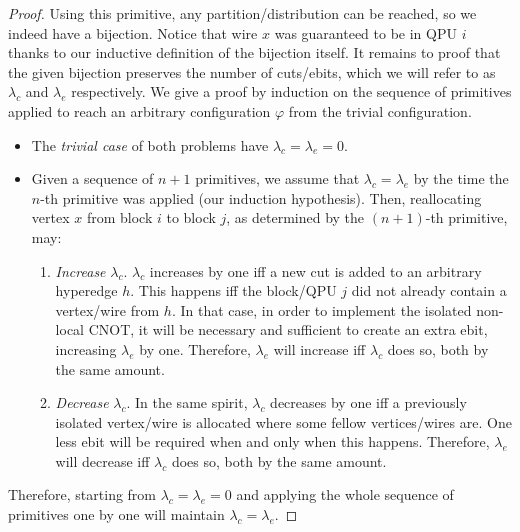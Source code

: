 \begin{proof}
Using this primitive, any partition/distribution can be reached, so we indeed have a bijection. Notice that wire \(x\) was guaranteed to be in QPU \(i\) thanks to our inductive definition of the bijection itself. It remains to proof that the given bijection preserves the number of cuts/ebits, which we will refer to as \(\lambda_c\) and \(\lambda_e\) respectively. We give a proof by induction on the sequence of primitives applied to reach an arbitrary configuration \(\varphi\) from the trivial configuration. 
\begin{itemize}
  \item The \textit{trivial case} of both problems have \(\lambda_c = \lambda_e = 0\).
  \item Given a sequence of \(n+1\) primitives, we assume that \(\lambda_c = \lambda_e\) by the time the \(n\)-th primitive was applied (our induction hypothesis). Then, reallocating vertex \(x\) from block \(i\) to block \(j\), as determined by the \((n+1)\)-th primitive, may:
    \begin{enumerate}
    \renewcommand{\theenumi}{\alph{enumi})}
      \item \textit{Increase} \(\lambda_c\). \(\lambda_c\) increases by one iff a new cut is added to an arbitrary hyperedge \(h\). This happens iff the block/QPU \(j\) did not already contain a vertex/wire from \(h\). In that case, in order to implement the isolated non-local CNOT, it will be necessary and sufficient to create an extra ebit, increasing \(\lambda_e\) by one. Therefore, \(\lambda_e\) will increase iff \(\lambda_c\) does so, both by the same amount.
      \item \textit{Decrease} \(\lambda_c\). In the same spirit, \(\lambda_c\) decreases by one iff a previously isolated vertex/wire is allocated where some fellow vertices/wires are. One less ebit will be required when and only when this happens. Therefore, \(\lambda_e\) will decrease iff \(\lambda_c\) does so, both by the same amount.
    \end{enumerate}
\end{itemize}

Therefore, starting from \(\lambda_c = \lambda_e = 0\) and applying the whole sequence of primitives one by one will maintain \(\lambda_c = \lambda_e\).

\end{proof}

